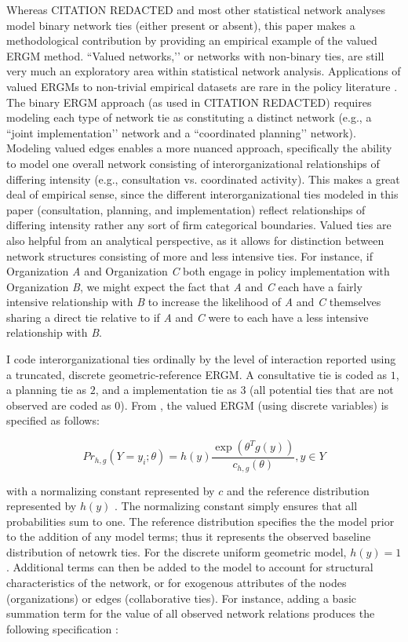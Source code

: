\documentclass[12pt,a4paper,titlepage]{article}
\begin{document}
Whereas CITATION REDACTED and most other statistical network analyses model binary network ties (either present or absent), this paper makes a methodological contribution by providing an empirical example of the valued ERGM method. ``Valued networks,’’ or networks with non-binary ties, are still very much an exploratory area within statistical network analysis. Applications of valued ERGMs to non-trivial empirical datasets are rare in the policy literature \parencite{desmarais2012, krivitsky2012}. The binary ERGM approach (as used in CITATION REDACTED) requires modeling each type of network tie as constituting a distinct network (e.g., a ``joint implementation’’ network and a ``coordinated planning’’ network). Modeling valued edges enables a more nuanced approach, specifically the ability to model one overall network consisting of interorganizational relationships of differing intensity (e.g., consultation vs. coordinated activity). This makes a great deal of empirical sense, since the different interorganizational ties modeled in this paper (consultation, planning, and implementation) reflect relationships of differing intensity rather any sort of firm categorical boundaries. Valued ties are also helpful from an analytical perspective, as it allows for distinction between network structures consisting of more and less intensive ties. For instance, if Organization \textit{A} and Organization \textit{C} both engage in policy implementation with Organization \textit{B}, we might expect the fact that \textit{A} and \textit{C} each have a fairly intensive relationship with \textit{B} to increase the likelihood of \textit{A} and \textit{C} themselves sharing a direct tie relative to if \textit{A} and \textit{C} were to each have a less intensive relationship with \textit{B}.

I code interorganizational ties ordinally by the level of interaction reported using a truncated, discrete geometric-reference ERGM. A consultative tie is coded as $1$, a planning tie as $2$, and a implementation tie as $3$ (all potential ties that are not observed are coded as $0$). From \textcite{krivitsky2012}, the valued ERGM (using discrete variables) is specified as follows:

\begin{equation}
Pr_{h,g}(Y=y_{i};\theta)= h(y) \frac{\exp(\theta^{T}g(y))}{c_{h,g}(\theta)}, y \in Y
\label{eq:ERGM}
\end{equation}

with a normalizing constant represented by $c$ and the reference distribution represented by $h(y)$ \parencite{krivitsky2013}. The normalizing constant simply ensures that all probabilities sum to one. The reference distribution specifies the the model prior to the addition of any model terms; thus it represents the observed baseline distribution of netowrk ties. For the discrete uniform geometric model, $h(y) = 1$ \parencite{krivitsky2012}. Additional terms can then be added to the model to account for structural characteristics of the network, or for exogenous attributes of the nodes (organizations) or edges (collaborative ties). For instance, adding a basic summation term for the value of all observed network relations produces the following specification \parencite{krivitsky2013}:
\end{document}

